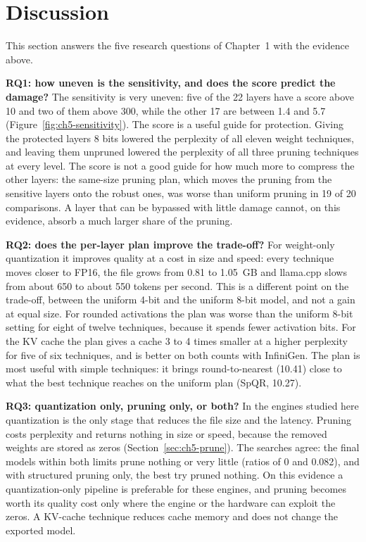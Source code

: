 \section{Discussion}
\label{sec:ch5-discussion}

This section answers the five research questions of Chapter~1 with the evidence above.

\textbf{RQ1: how uneven is the sensitivity, and does the score predict the damage?} The sensitivity is very uneven: five of the 22 layers have a score above 10 and two of them above 300, while the other 17 are between 1.4 and 5.7 (Figure~\ref{fig:ch5-sensitivity}). The score is a useful guide for protection. Giving the protected layers 8 bits lowered the perplexity of all eleven weight techniques, and leaving them unpruned lowered the perplexity of all three pruning techniques at every level. The score is not a good guide for how much more to compress the other layers: the same-size pruning plan, which moves the pruning from the sensitive layers onto the robust ones, was worse than uniform pruning in 19 of 20 comparisons. A layer that can be bypassed with little damage cannot, on this evidence, absorb a much larger share of the pruning.

\textbf{RQ2: does the per-layer plan improve the trade-off?} For weight-only quantization it improves quality at a cost in size and speed: every technique moves closer to FP16, the file grows from 0.81 to 1.05~GB and llama.cpp slows from about 650 to about 550 tokens per second. This is a different point on the trade-off, between the uniform 4-bit and the uniform 8-bit model, and not a gain at equal size. For rounded activations the plan was worse than the uniform 8-bit setting for eight of twelve techniques, because it spends fewer activation bits. For the KV cache the plan gives a cache 3 to 4 times smaller at a higher perplexity for five of six techniques, and is better on both counts with InfiniGen. The plan is most useful with simple techniques: it brings round-to-nearest (10.41) close to what the best technique reaches on the uniform plan (SpQR, 10.27).

\textbf{RQ3: quantization only, pruning only, or both?} In the engines studied here quantization is the only stage that reduces the file size and the latency. Pruning costs perplexity and returns nothing in size or speed, because the removed weights are stored as zeros (Section~\ref{sec:ch5-prune}). The searches agree: the final models within both limits prune nothing or very little (ratios of 0 and 0.082), and with structured pruning only, the best try pruned nothing. On this evidence a quantization-only pipeline is preferable for these engines, and pruning becomes worth its quality cost only where the engine or the hardware can exploit the zeros. A KV-cache technique reduces cache memory and does not change the exported model.

